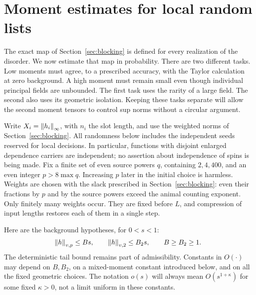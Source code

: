\section{Moment estimates for local random lists}\label{sec:norms}
The exact map of Section~\ref{sec:blocking} is defined for every
realization of the disorder.  We now estimate that map in probability.
There are two different tasks.  Low moments must agree, to a prescribed
accuracy, with the Taylor calculation at zero background.  A high moment
must remain small even though individual principal fields are unbounded.
The first task uses the rarity of a large field.  The second also uses its
geometric isolation.  Keeping these tasks separate will allow the second
moment tensors to control sup norms without a circular argument.

Write $X_i=\left\lVert h_i\right\rVert_\infty$, with $n_i$ the slot length, and use the
weighted norms of Section~\ref{sec:blocking}.  All randomness below includes
the independent seeds reserved for local decisions.  In particular,
functions with disjoint enlarged dependence carriers are independent;
no assertion about independence of spins is being made.  Fix a finite set
of even source powers $q$, containing $2,4,400$, and an even integer
$p>8\max q$.  Increasing $p$ later in the initial choice is harmless.
Weights are chosen with the slack prescribed in Section~\ref{sec:blocking}:
even their fractions by $p$ and by the source powers exceed the animal
counting exponent.  Only finitely many weights occur.  They are fixed
before $L$, and compression of input lengths restores each of them in a
single step.

Here are the background hypotheses, for $0<s<1$:
\begin{equation}\label{norm:input}
 \left\lVert h\right\rVert_{v,p}\le Bs,\qquad \left\lVert h\right\rVert_{v,2}\le B_2s,
 \qquad B\ge B_2\ge1.
\end{equation}
The deterministic tail bound remains part of admissibility.  Constants in
$O(\cdot)$ may depend on $B,B_2$, on a mixed-moment constant introduced
below, and on all the fixed geometric choices.  The notation $o(s)$ will
always mean $O(s^{1+\kappa})$ for some fixed $\kappa>0$, not a limit
uniform in these constants.

